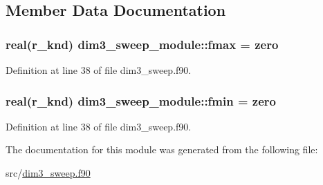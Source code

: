 \subsection{Member Data Documentation}
\hypertarget{classdim3__sweep__module_aac295110595a9c85602d58906d51cd46}{
\subsubsection[{fmax}]{\setlength{\rightskip}{0pt plus 5cm}real(r\-\_\-knd) dim3\-\_\-sweep\-\_\-module\-::fmax = zero}}\label{classdim3__sweep__module_aac295110595a9c85602d58906d51cd46}


Definition at line 38 of file dim3\-\_\-sweep.\-f90.

\hypertarget{classdim3__sweep__module_a5ec448e8a99070a51d62e75a430a9c60}{
\subsubsection[{fmin}]{\setlength{\rightskip}{0pt plus 5cm}real(r\-\_\-knd) dim3\-\_\-sweep\-\_\-module\-::fmin = zero}}\label{classdim3__sweep__module_a5ec448e8a99070a51d62e75a430a9c60}


Definition at line 38 of file dim3\-\_\-sweep.\-f90.



The documentation for this module was generated from the following file\-:\begin{DoxyCompactItemize}
\item 
src/\hyperlink{dim3__sweep_8f90}{dim3\-\_\-sweep.\-f90}\end{DoxyCompactItemize}
